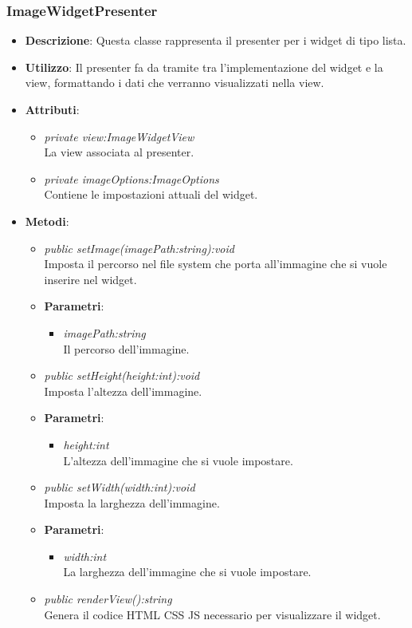 \subsubsection{ImageWidgetPresenter}
\begin{itemize}
\item \textbf{Descrizione}: Questa classe rappresenta il presenter per i widget di tipo lista.
\item \textbf{Utilizzo}: Il presenter fa da tramite tra l'implementazione del widget e la view, formattando i dati che verranno visualizzati nella view.
\item \textbf{Attributi}:
	\begin{itemize}
	\item \textit{private view:ImageWidgetView}\\
	La view associata al presenter.
	\item \textit{private imageOptions:ImageOptions}\\
	Contiene le impostazioni attuali del widget.
	\end{itemize}
\item \textbf{Metodi}:
	\begin{itemize}
	\item \textit{public setImage(imagePath:string):void}\\
	Imposta il percorso nel file system che porta all'immagine che si vuole inserire nel widget.
		\item{\textbf{Parametri}: \begin{itemize}
		\item \textit{imagePath:string}\\
		Il percorso dell'immagine.
		\end{itemize}}
	\item \textit{public setHeight(height:int):void}\\
	Imposta l'altezza dell'immagine.
		\item{\textbf{Parametri}: \begin{itemize}
		\item \textit{height:int}\\
		L'altezza dell'immagine che si vuole impostare.
		\end{itemize}}
	\item \textit{public setWidth(width:int):void}\\
	Imposta la larghezza dell'immagine.
		\item{\textbf{Parametri}: \begin{itemize}
		\item \textit{width:int}\\
		La larghezza dell'immagine che si vuole impostare.
		\end{itemize}}
	\item \textit{public renderView():string}\\
	Genera il codice HTML CSS JS necessario per visualizzare il widget.
	\end{itemize}
\end{itemize}


